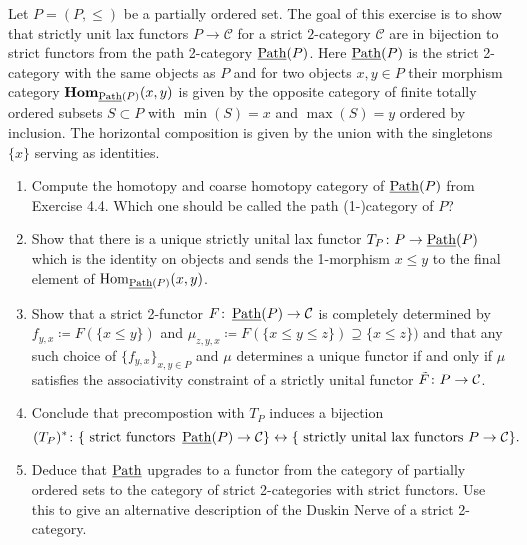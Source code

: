 \begin{Exercise}
	Let $ P = ( P , \leq ) $ be a partially ordered set. 
	The goal of this exercise is to show that strictly unit lax functors $ P \to \mathcal{ C } $ for a strict $ 2 $-category $ \mathcal{ C } $ are in bijection to strict functors from the path 2-category $ \operatorname{\underline{Path}} ( P ) $.
	Here $ \operatorname{\underline{Path}} ( P ) $ is the strict 2-category with the same objects as $ P $ and for two objects $ x , y \in P $ their morphism category $ \operatorname{\bold{Hom}}_{ \operatorname{\underline{Path}} ( P ) } ( x , y ) $ is given by the opposite category of finite totally ordered subsets $ S \subset P $ with $ \min ( S ) = x $ and $ \max ( S ) = y $ ordered by inclusion.
	The horizontal composition is given by the union with the singletons $ \{ x \} $ serving as identities.
	
	\begin{enumerate}[label=(\alph*)]
		\item 
		Compute the homotopy and coarse homotopy category of $ \operatorname{\underline{Path}} ( P ) $ from Exercise 4.4.
		Which one should be called the path (1-)category of $P$?
		
		\item 
		Show that there is a unique strictly unital lax functor $ T_P \colon P \to \operatorname{\underline{Path}} ( P ) $ which is the identity on objects and sends the 1-morphism $ x \leq y $ to the final element of $ \operatorname{Hom}_{ \operatorname{\underline{Path}} ( P ) } ( x , y ) $.
		
		\item 
		Show that a strict 2-functor $ F \colon \operatorname{\underline{Path}} ( P ) \to \mathcal{ C } $ is completely determined by $ f_{ y , x } \coloneqq F ( \{ x \leq y \} ) $ and 
		$ \mu_{ z , y , x } \coloneqq F ( \{ x \leq y \leq z \} ) \supseteq \{ x \leq z \} ) $ and that any such choice of $ \{ f_{ y ,x } \}_{ x ,y \in P } $ and $ \mu $ determines a unique functor if and only if $ \mu $ satisfies the associativity constraint of a strictly unital functor $ \Tilde{ F } \colon P \to \mathcal{ C } $.
		
		\item 
		Conclude that precompostion with $ T_P $ induces a bijection 
		\[
		( T_P )^* \colon \{ \text{ strict functors } \operatorname{\underline{Path}} ( P ) \to \mathcal{ C } \}
		\leftrightarrow \{ \text{ strictly unital lax functors } P \to \mathcal{ C } \}.
		\]
		
		\item 
		Deduce that $ \operatorname{\underline{Path}} $ upgrades to a functor from the category of partially ordered sets to the category of strict 2-categories with strict functors. 
		Use this to give an alternative description of the Duskin Nerve of a strict 2-category.
	\end{enumerate}
\end{Exercise}

